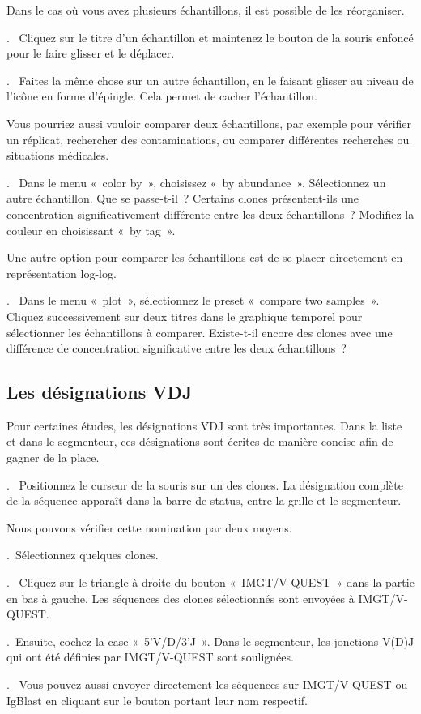 \documentclass[11pt]{article}
\newcounter{questionum}
\newcommand\com[1]{\textsf{«~#1~»}}
\newcommand\question[1]{\par\noindent\textbf{\thequestionum}.~#1\addtocounter{questionum}{1}}
\let\oldmarginpar\marginpar
\renewcommand\marginpar[1]{\oldmarginpar{\tiny#1}}
\begin{document}
\bigskip

Dans le cas où vous avez plusieurs échantillons, il est possible de les
réorganiser.

\question{%
  Cliquez sur le titre d'un échantillon et maintenez le bouton de la
  souris enfoncé pour le faire glisser et le déplacer.}
\question{%
  Faites la même chose sur un autre échantillon, en le faisant glisser au
  niveau de l'icône en forme d'épingle. Cela permet de cacher
  l'échantillon.
}

\bigskip

Vous pourriez aussi vouloir comparer deux échantillons, par exemple pour vérifier
un réplicat, rechercher des contaminations, ou comparer
différentes recherches ou situations médicales.

\question{%
  Dans le menu \com{color by}, choisissez \com{by abundance}. Sélectionnez un
  autre échantillon. Que se passe-t-il~? Certains clones présentent-ils
  une concentration significativement différente entre les deux
  échantillons~? Modifiez la couleur en choisissant \com{by tag}.}

Une autre option pour comparer les échantillons est de se placer
directement en représentation log-log.

\question{%
  Dans le menu \com{plot}, sélectionnez le preset \com{compare two samples}.
  Cliquez successivement sur deux titres dans le graphique temporel pour
  sélectionner les échantillons à comparer. Existe-t-il encore des
  clones avec une différence de concentration significative entre les deux
  échantillons~?}

\subsection{Les désignations VDJ}

Pour certaines études, les désignations VDJ sont très importantes.
Dans la liste et dans le segmenteur, ces désignations sont écrites de manière
concise afin de gagner de la place.

\question{%
  Positionnez le curseur de la souris sur un des clones. La désignation
  complète de la séquence apparaît dans la barre de status, entre la
  grille et le segmenteur.}

Nous pouvons vérifier cette nomination par deux moyens.

\question{Sélectionnez quelques clones.}
\question{%
\marginpar{Cela nécessite une connexion internet}
  Cliquez sur le triangle à droite du bouton \com{IMGT/V-QUEST} dans la
  partie en bas à gauche. Les séquences des clones sélectionnés sont
  envoyées à IMGT/V-QUEST.}
\question{Ensuite, cochez la case \com{5'V/D/3'J}. Dans le segmenteur, les jonctions
  V(D)J qui ont été définies par IMGT/V-QUEST sont soulignées.}
\question{%
  Vous pouvez aussi envoyer directement les séquences sur IMGT/V-QUEST
  ou IgBlast en cliquant sur le bouton portant leur nom respectif.}
\end{document}
